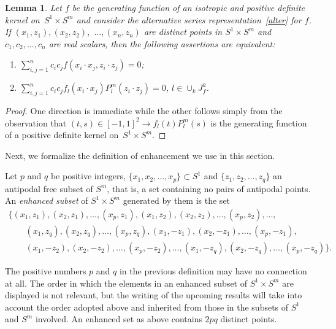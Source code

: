 \documentclass[11pt]{article}
\numberwithin{equation}{section}
\newtheorem{Lemma}[Theorem]{Lemma}
\begin{document}
\begin{Lemma}\label{basic}
Let $f$ be the generating function of an isotropic and positive definite kernel on~\mbox{$S^1 \times S^m$} and consider the alternative series representation~\eqref{alter} for $f$. If $(x_1,z_1),(x_2,z_2),$ $ \ldots, (x_n,z_n)$ are distinct points in $S^1 \times S^m$ and $c_1, c_2, \ldots, c_n$ are real scalars, then the following assertions are equivalent:
\begin{enumerate}\itemsep=0pt
\item[$(i)$] $\sum\limits_{i,j=1}^n c_i c_j f(x_i \cdot x_j,z_i \cdot z_j)=0$;
\item[$(ii)$] $\sum\limits_{i,j=1}^n c_i c_j f_l(x_i \cdot x_j) P_l^m(z_i \cdot z_j)=0$, $l\in \cup_{k}J_f^k$.
\end{enumerate}
\end{Lemma}
\begin{proof}
One direction is immediate while the other follows simply from the observation that $(t,s) \in [-1,1]^2 \to f_l(t)P_l^m(s)$ is the generating function of a positive def\/inite kernel \linebreak on~\mbox{$S^1 \times S^m$}.
\end{proof}

Next, we formalize the def\/inition of enhancement we use in this section.

\begin{Definition} Let $p$ and $q$ be positive integers, $\{x_1,x_2, \ldots, x_p\} \subset S^1$ and $\{z_1,z_2, \ldots, z_q\}$ an antipodal free subset of $S^m$, that is, a set containing no pairs of antipodal points. An {\em enhanced subset} of $S^1 \times S^m$ generated by them is the set
\begin{gather*}\big\{(x_1,z_1), (x_2,z_1), \ldots, (x_p,z_1), (x_1,z_2), (x_2,z_2), \ldots, (x_p,z_2),\ldots, \\
\qquad{} (x_1,z_q),(x_2,z_q),\ldots, (x_p,z_q), (x_1,-z_1), (x_2,-z_1), \ldots, (x_p,-z_1), \\
\qquad{} (x_1,-z_2), (x_2,-z_2), \ldots,(x_p,-z_2),\ldots, (x_1,-z_q), (x_2,-z_q), \ldots, (x_p,-z_q)\big\}.\end{gather*}
\end{Definition}

The positive numbers $p$ and $q$ in the previous def\/inition may have no connection at all. The order in which the elements in an enhanced subset of $S^1 \times S^m$ are displayed is not relevant, but the writing of the upcoming results will take into account the order adopted above and inherited from those in the subsets of $S^1$ and $S^m$ involved. An enhanced set as above contains $2pq$ distinct points.
\end{document}
